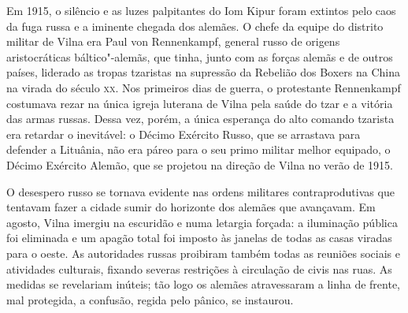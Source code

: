 Em 1915, o silêncio e as luzes palpitantes do Iom Kipur foram extintos
pelo caos da fuga russa e a iminente chegada dos alemães. O chefe da
equipe do distrito militar de Vilna era Paul von Rennenkampf, general
russo de origens aristocráticas báltico"-alemãs, que tinha, junto com as
forças alemãs e de outros países, liderado as tropas tzaristas na
supressão da Rebelião dos Boxers na China na virada do século \textsc{xx}. Nos
primeiros dias de guerra, o protestante Rennenkampf costumava rezar na
única igreja luterana de Vilna pela saúde do tzar e a vitória das armas
russas. Dessa vez, porém, a única esperança do alto comando tzarista era
retardar o inevitável: o Décimo Exército Russo, que se arrastava para
defender a Lituânia, não era páreo para o seu primo militar melhor
equipado, o Décimo Exército Alemão, que se projetou na direção de Vilna
no verão de 1915.

O desespero russo se tornava evidente nas ordens militares
contraprodutivas que tentavam fazer a cidade sumir do horizonte dos
alemães que avançavam. Em agosto, Vilna imergiu na escuridão e numa
letargia forçada: a iluminação pública foi eliminada e um apagão total
foi imposto às janelas de todas as casas viradas para o oeste. As
autoridades russas proibiram também todas as reuniões sociais e
atividades culturais, fixando severas restrições à circulação de civis
nas ruas. As medidas se revelariam inúteis; tão logo os alemães
atravessaram a linha de frente, mal protegida, a confusão, regida pelo
pânico, se instaurou.

